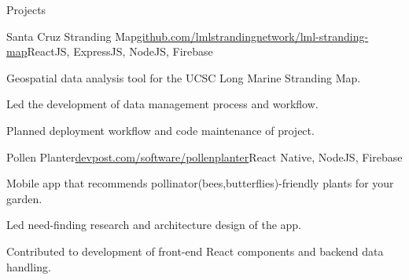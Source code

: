 \documentclass{resume} %
\begin{document}

\begin{rSection}{Projects}
    \begin{rSubsection}{Santa Cruz Stranding Map}{\href{https://github.com/lmlstrandingnetwork/lml-stranding-map}{github.com/lmlstrandingnetwork/lml-stranding-map}}{ReactJS, ExpressJS, NodeJS, Firebase}{}
        \item Geospatial data analysis tool for the UCSC Long Marine Stranding Map.
        \item Led the development of data management process and workflow.
        \item Planned deployment workflow and code maintenance of project.
    \end{rSubsection}

    \begin{rSubsection}{Pollen Planter}{\href{https://www.devpost.com/software/pollenplanter}{devpost.com/software/pollenplanter}}{React Native, NodeJS, Firebase}{}
        \item Mobile app that recommends pollinator(bees,butterflies)-friendly plants for your garden.
        \item Led need-finding research and architecture design of the app.
        \item Contributed to development of front-end React components and backend data handling.
    \end{rSubsection}
\end{rSection}





\end{document}
